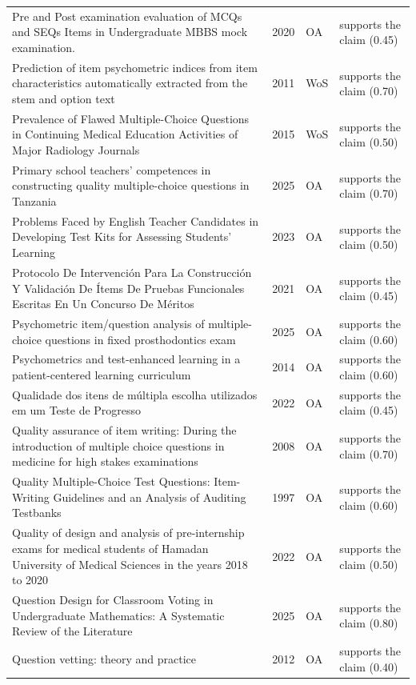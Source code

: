 \begin{longtable}{@{}%
  >{\raggedright\arraybackslash}p{}c%
  >{\raggedright\arraybackslash}p{}%
  >{\raggedright\arraybackslash}p{}@{}}
Pre and Post examination evaluation of MCQs and SEQs Items in Undergraduate MBBS mock examination. & 2020 & OA & supports the claim (0.45) \\
Prediction of item psychometric indices from item characteristics automatically extracted from the stem and option text & 2011 & WoS & supports the claim (0.70) \\
Prevalence of Flawed Multiple-Choice Questions in Continuing Medical Education Activities of Major Radiology Journals & 2015 & WoS & supports the claim (0.50) \\
Primary school teachers' competences in constructing quality multiple-choice questions in Tanzania & 2025 & OA & supports the claim (0.70) \\
Problems Faced by English Teacher Candidates in Developing Test Kits for Assessing Students' Learning & 2023 & OA & supports the claim (0.50) \\
Protocolo De Intervención Para La Construcción Y Validación De Ítems De Pruebas Funcionales Escritas En Un Concurso De Méritos & 2021 & OA & supports the claim (0.45) \\
Psychometric item/question analysis of multiple-choice questions in fixed prosthodontics exam & 2025 & OA & supports the claim (0.60) \\
Psychometrics and test-enhanced learning in a patient-centered learning curriculum & 2014 & OA & supports the claim (0.60) \\
Qualidade dos itens de múltipla escolha utilizados em um Teste de Progresso & 2022 & OA & supports the claim (0.45) \\
Quality assurance of item writing: During the introduction of multiple choice questions in medicine for high stakes examinations & 2008 & OA & supports the claim (0.70) \\
Quality Multiple-Choice Test Questions: Item-Writing Guidelines and an Analysis of Auditing Testbanks & 1997 & OA & supports the claim (0.60) \\
Quality of design and analysis of pre-internship exams for medical students of Hamadan University of Medical Sciences in the years 2018 to 2020 & 2022 & OA & supports the claim (0.50) \\
Question Design for Classroom Voting in Undergraduate Mathematics: A Systematic Review of the Literature & 2025 & OA & supports the claim (0.80) \\
Question vetting: theory and practice & 2012 & OA & supports the claim (0.40) \\

\end{longtable}
